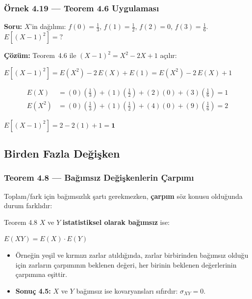 \documentclass[light]{lutbeamer}
\begin{document}
\begin{frame}[fragile]
  \frametitle[Örnek 4.19]{Örnek 4.19 --- Teorem 4.6 Uygulaması}

  \smallskip
  \textbf{Soru:} $X$'in dağılımı: $f(0)=\tfrac{1}{3}$, $f(1)=\tfrac{1}{2}$, $f(2)=0$, $f(3)=\tfrac{1}{6}$. \; $E[(X-1)^2] = ?$

  \medskip
  \textbf{Çözüm:} Teorem~4.6 ile $(X-1)^2 = X^2 - 2X + 1$ açılır:
  \begin{center}
    $E[(X-1)^2] = E(X^2) - 2\,E(X) + E(1) = E(X^2) - 2\,E(X) + 1$
  \end{center}

  {\small
  \begin{align*}
    E(X) &= (0)\!\left(\tfrac{1}{3}\right) + (1)\!\left(\tfrac{1}{2}\right) + (2)(0) + (3)\!\left(\tfrac{1}{6}\right) = 1 \\[4pt]
    E(X^2) &= (0)\!\left(\tfrac{1}{3}\right) + (1)\!\left(\tfrac{1}{2}\right) + (4)(0) + (9)\!\left(\tfrac{1}{6}\right) = 2
  \end{align*}
  }
  \begin{center}
    $E[(X-1)^2] = 2 - 2(1) + 1 = \mathbf{1}$
  \end{center}
\end{frame}

\subsection{Birden Fazla Değişken}

\begin{frame}[fragile]
  \frametitle{Teorem 4.8 --- Bağımsız Değişkenlerin Çarpımı}
  Toplam/fark için bağımsızlık şartı gerekmezken, \textbf{çarpım} söz konusu olduğunda durum farklıdır:
  \begin{center}
    \begin{minipage}{0.9\textwidth}
      \begin{block}{Teorem 4.8}
        $X$ ve $Y$ \textbf{istatistiksel olarak bağımsız} ise:
        \begin{center}
          $E(XY) = E(X) \cdot E(Y)$
        \end{center}
      \end{block}
    \end{minipage}
  \end{center}

  \medskip
  \begin{itemize}
    \item Örneğin yeşil ve kırmızı zarlar atıldığında, zarlar birbirinden bağımsız olduğu için zarların çarpımının beklenen değeri, her birinin beklenen değerlerinin çarpımına eşittir.
    \item \textbf{Sonuç 4.5:} $X$ ve $Y$ bağımsız ise kovaryansları sıfırdır: $\sigma_{XY} = 0$.
  \end{itemize}
\end{frame}
\end{document}

